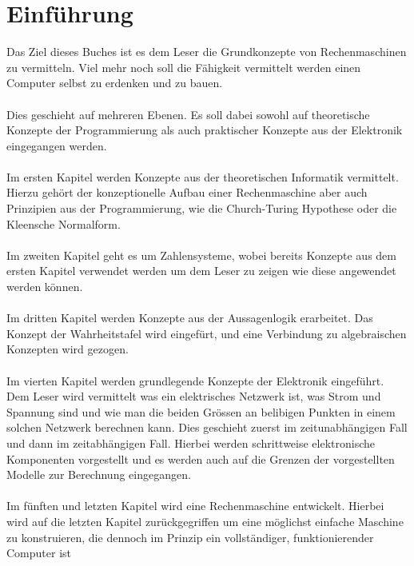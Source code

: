 \documentclass[11pt,a4paper,leqno]{report}
\numberwithin{equation}{chapter}
\begin{document}
\chapter{Einf\"uhrung}
Das Ziel dieses Buches ist es dem Leser die Grundkonzepte von Rechenmaschinen zu vermitteln. 
Viel mehr noch soll die F\"ahigkeit vermittelt werden einen Computer selbst zu erdenken und zu bauen.\\
\\
Dies geschieht auf mehreren Ebenen. Es soll dabei sowohl auf theoretische Konzepte der Programmierung als auch praktischer Konzepte aus der Elektronik eingegangen werden.\\
\\
Im ersten Kapitel werden Konzepte aus der theoretischen Informatik vermittelt. Hierzu geh\"ort der konzeptionelle Aufbau einer Rechenmaschine aber auch Prinzipien aus der Programmierung, wie die Church-Turing Hypothese oder die Kleensche Normalform.\\
\\
Im zweiten Kapitel geht es um Zahlensysteme, wobei bereits Konzepte aus dem ersten Kapitel verwendet werden um dem Leser zu zeigen wie diese angewendet werden k\"onnen.\\
\\
Im dritten Kapitel werden Konzepte aus der Aussagenlogik erarbeitet. Das Konzept der Wahrheitstafel wird eingef\"urt, und eine Verbindung zu algebraischen Konzepten wird gezogen.\\
\\
Im vierten Kapitel werden grundlegende Konzepte der Elektronik eingef\"uhrt. Dem Leser wird vermittelt was ein elektrisches Netzwerk ist, was Strom und Spannung sind und wie man die beiden Gr\"ossen an belibigen Punkten in einem solchen Netzwerk berechnen kann. Dies geschieht zuerst im zeitunabh\"angigen Fall und dann im zeitabh\"angigen Fall. Hierbei werden schrittweise elektronische Komponenten vorgestellt und es werden auch auf die Grenzen der vorgestellten Modelle zur Berechnung eingegangen.\\
\\
Im f\"unften und letzten Kapitel wird eine Rechenmaschine entwickelt. Hierbei wird auf die letzten Kapitel zur\"uckgegriffen um eine m\"oglichst einfache Maschine zu konstruieren, die dennoch im Prinzip ein vollst\"andiger, funktionierender Computer ist

\end{document}
